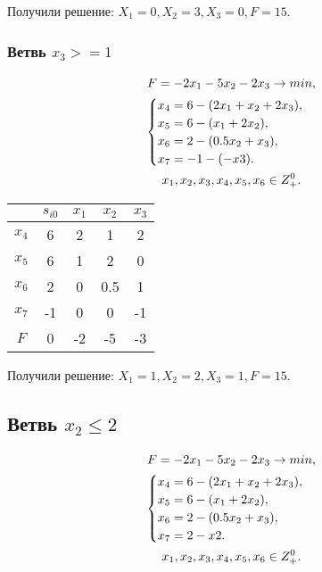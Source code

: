 \documentclass[12pt,a4paper,oneside]{extarticle}
\begin{document}
            Получили решение: $X_1=0, X_2=3, X_3=0,  F=15$.


        \subsubsection{Ветвь $x_3 >= 1$}
            \begin{gather}
                F = -2x_1-5x_2-2x_3 \rightarrow min,  \notag  \\
                \begin{cases}
                    x_4 = 6 - (2x_1 + x_2 + 2x_3), \\
                    x_5 = 6 - (x_1 + 2x_2),\\
                    x_6 = 2 - (0.5x_2 + x_3), \\
                    x_7 = -1 - (-x3). 
                \end{cases} 
                \notag \\
                x_1, x_2, x_3, x_4, x_5, x_6 \in Z^0_+. \notag
            \end{gather}

            \begin{center}
            \begin{tabular}{|c|c|c|c|c|}
                \hline
                     & $s_{i0}$ & $x_1$ & $x_2$ & $x_3$ \\ \hline
                $x_4$ & 6       & 2     & 1     & 2 \\ \hline
                $x_5$ & 6       & 1     & 2     & 0 \\ \hline
                $x_6$ & 2       & 0     & 0.5   & 1 \\ \hline
                $x_7$ & -1      & 0     & 0     & -1 \\ \hline
                $F$   & 0       & -2    & -5    & -3 \\ \hline
            \end{tabular}
            \end{center}

            Получили решение: $X_1=1, X_2=2, X_3=1,  F=15$.

    \subsection{Ветвь $x_2 \leq 2$}
        \begin{gather}
            F = -2x_1-5x_2-2x_3 \rightarrow min,  \notag  \\
            \begin{cases}
                x_4 = 6 - (2x_1 + x_2 + 2x_3), \\
                x_5 = 6 - (x_1 + 2x_2),\\
                x_6 = 2 - (0.5x_2 + x_3), \\
                x_7 = 2 - x2. 
            \end{cases} 
            \notag \\
            x_1, x_2, x_3, x_4, x_5, x_6 \in Z^0_+. \notag
        \end{gather}
\end{document}
